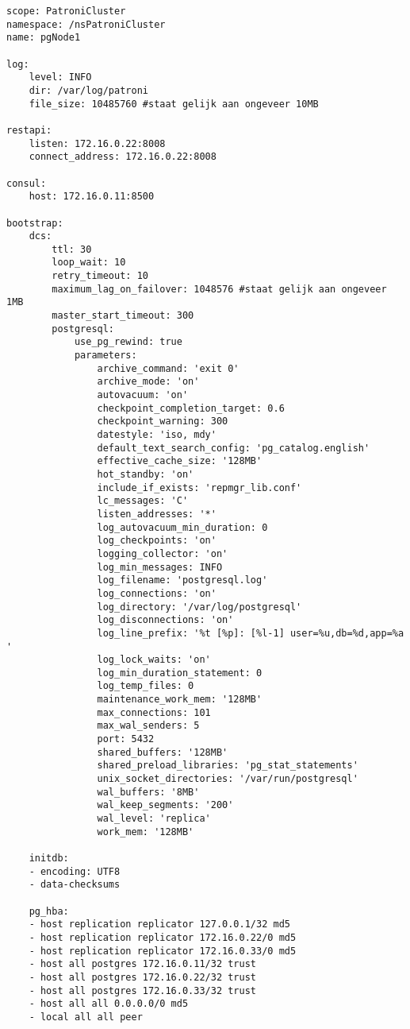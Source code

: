 \begin{lstlisting}
scope: PatroniCluster
namespace: /nsPatroniCluster
name: pgNode1

log:
    level: INFO
    dir: /var/log/patroni
    file_size: 10485760 #staat gelijk aan ongeveer 10MB

restapi:
    listen: 172.16.0.22:8008
    connect_address: 172.16.0.22:8008

consul:
    host: 172.16.0.11:8500

bootstrap:
    dcs:
        ttl: 30
        loop_wait: 10
        retry_timeout: 10
        maximum_lag_on_failover: 1048576 #staat gelijk aan ongeveer 1MB
        master_start_timeout: 300
        postgresql:
            use_pg_rewind: true
            parameters:
                archive_command: 'exit 0'
                archive_mode: 'on'
                autovacuum: 'on'
                checkpoint_completion_target: 0.6
                checkpoint_warning: 300
                datestyle: 'iso, mdy'
                default_text_search_config: 'pg_catalog.english'
                effective_cache_size: '128MB'
                hot_standby: 'on'
                include_if_exists: 'repmgr_lib.conf'
                lc_messages: 'C'
                listen_addresses: '*'
                log_autovacuum_min_duration: 0
                log_checkpoints: 'on'
                logging_collector: 'on'
                log_min_messages: INFO
                log_filename: 'postgresql.log'
                log_connections: 'on'
                log_directory: '/var/log/postgresql'
                log_disconnections: 'on'
                log_line_prefix: '%t [%p]: [%l-1] user=%u,db=%d,app=%a '
                log_lock_waits: 'on'
                log_min_duration_statement: 0
                log_temp_files: 0
                maintenance_work_mem: '128MB'
                max_connections: 101
                max_wal_senders: 5
                port: 5432
                shared_buffers: '128MB'
                shared_preload_libraries: 'pg_stat_statements'
                unix_socket_directories: '/var/run/postgresql'
                wal_buffers: '8MB'
                wal_keep_segments: '200'
                wal_level: 'replica'
                work_mem: '128MB'

    initdb:
    - encoding: UTF8
    - data-checksums

    pg_hba:
    - host replication replicator 127.0.0.1/32 md5
    - host replication replicator 172.16.0.22/0 md5
    - host replication replicator 172.16.0.33/0 md5
    - host all postgres 172.16.0.11/32 trust
    - host all postgres 172.16.0.22/32 trust
    - host all postgres 172.16.0.33/32 trust
    - host all all 0.0.0.0/0 md5
    - local all all peer
    

\end{lstlisting}
